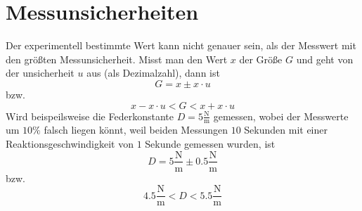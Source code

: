\documentclass{article}
\begin{document}
\section{Messunsicherheiten}
Der experimentell bestimmte Wert kann nicht genauer sein, als der Messwert mit den größten Messunsicherheit. Misst man den Wert $x$ der Größe $G$ und geht von der unsicherheit $u$ aus (als Dezimalzahl), dann ist
\[
 G = x \pm x \cdot u
\]
bzw. 
\[
 x - x \cdot u < G < x + x \cdot u
\]
Wird beispeilsweise die Federkonstante $D=5 \frac{\si{\newton}}{\si{\meter}}$ gemessen, wobei der Messwerte um $10\%$ falsch liegen könnt, weil beiden Messungen $10$ Sekunden mit einer Reaktionsgeschwindigkeit von $1$ Sekunde gemessen wurden, ist
\[
 D = 5 \frac{\si{\newton}}{\si{\meter}} \pm 0.5 \frac{\si{\newton}}{\si{\meter}}
\] 
bzw.
\[
 4.5 \frac{\si{\newton}}{\si{\meter}} < D < 5.5 \frac{\si{\newton}}{\si{\meter}}
\] 
 
\end{document}
